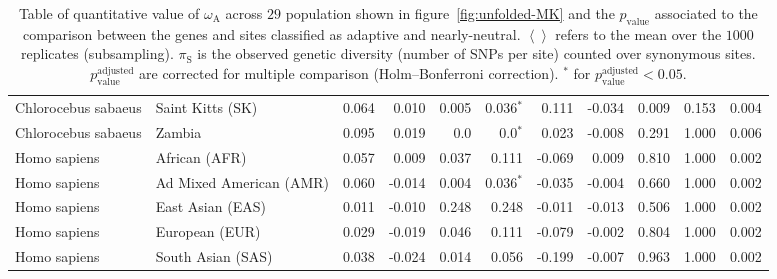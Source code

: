 \documentclass{article}
\begin{document}
\begin{table*}[h!]
\begin{adjustbox}{width = 1\textwidth}
\begin{tabular}{|l|l|r|r|r|r|r|r|r|r|r|}
\rowcolor{LIGHTGREY} Chlorocebus sabaeus & Saint Kitts (SK) & 0.064 & 0.010 & 0.005 & 0.036$\bm{^*}$ & 0.111 & -0.034 & 0.009 & 0.153\hspace{5pt} & 0.004 \\
\rowcolor{LIGHTGREY} Chlorocebus sabaeus & Zambia & 0.095 & 0.019 & 0.0 & 0.0$\bm{^*}$ & 0.023 & -0.008 & 0.291 & 1.000\hspace{5pt} & 0.006 \\ \hline
					 Homo sapiens & African (AFR) & 0.057 & 0.009 & 0.037 & 0.111\hspace{5pt} & -0.069 & 0.009 & 0.810 & 1.000\hspace{5pt} & 0.002 \\
					 Homo sapiens & Ad Mixed American (AMR) & 0.060 & -0.014 & 0.004 & 0.036$\bm{^*}$ & -0.035 & -0.004 & 0.660 & 1.000\hspace{5pt} & 0.002 \\
					 Homo sapiens & East Asian (EAS) & 0.011 & -0.010 & 0.248 & 0.248\hspace{5pt} & -0.011 & -0.013 & 0.506 & 1.000\hspace{5pt} & 0.002 \\
					 Homo sapiens & European (EUR) & 0.029 & -0.019 & 0.046 & 0.111\hspace{5pt} & -0.079 & -0.002 & 0.804 & 1.000\hspace{5pt} & 0.002 \\
					 Homo sapiens & South Asian (SAS) & 0.038 & -0.024 & 0.014 & 0.056\hspace{5pt} & -0.199 & -0.007 & 0.963 & 1.000\hspace{5pt} & 0.002 \\
			\bottomrule
	 \end{tabular}
	\end{adjustbox}
	\caption{
		Table of quantitative value of $\omega_{\mathrm{A}}$ across $29$ population shown in figure~\ref{fig:unfolded-MK} and the $p_{\mathrm{value}}$ associated to the comparison between the genes and sites classified as adaptive and nearly-neutral.
		$\left< \right>$ refers to the mean over the $1000$ replicates (subsampling).
		$\pi_{\textrm{S}}$ is the observed genetic diversity (number of SNPs per site) counted over synonymous sites.
		$p_{\mathrm{value}}^{\mathrm{adjusted}}$ are corrected for multiple comparison (Holm–Bonferroni correction).
		$^*$ for $p_{\mathrm{value}}^{\mathrm{adjusted}} < 0.05$.
	}
	\label{table:unfolded-MK}
\end{table*}
\end{document}
